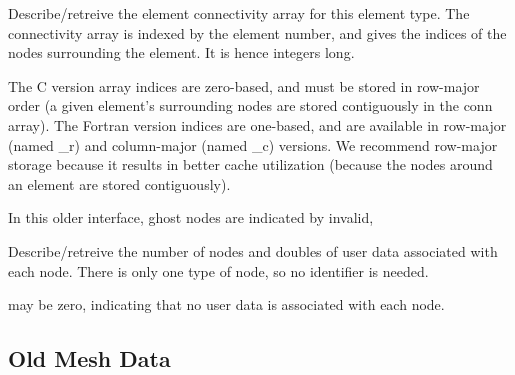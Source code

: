      Describe/retreive the element connectivity array for this element
     type.  The connectivity array is indexed by the element number,
     and gives the indices of the nodes surrounding the element.  It is
     hence  integers long.

     The C version array indices are zero-based, and must be stored in
     row-major order (a given element's surrounding nodes are stored
     contiguously in the conn array).  The Fortran version indices are
     one-based, and are available in row-major (named \_r) and
     column-major (named \_c) versions.  We recommend row-major storage
     because it results in better cache utilization (because the nodes
     around an element are stored contiguously).
     
     In this older interface, ghost nodes are indicated by invalid, 


     Describe/retreive the number of nodes and doubles of user data
     associated with each node.  There is only one type of node, so no
      identifier is needed.

      may be zero, indicating that no user data is
     associated with each node.
     

\subsection{Old Mesh Data}

